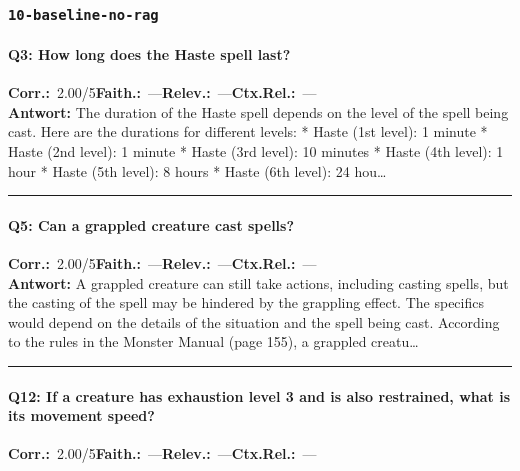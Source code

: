 \subsubsection*{\texttt{10-baseline-no-rag}}
\label{app:samples:10_baseline_no_rag}

\paragraph{Q3: How long does the Haste spell last?}
\noindent \textbf{Corr.:}~2.00/5\quad \textbf{Faith.:}~—\quad \textbf{Relev.:}~—\quad \textbf{Ctx.Rel.:}~—\\

\noindent\textbf{Antwort:} The duration of the Haste spell depends on the level of the spell being cast. Here are the durations for different levels:  * Haste (1st level): 1 minute * Haste (2nd level): 1 minute * Haste (3rd level): 10 minutes * Haste (4th level): 1 hour * Haste (5th level): 8 hours * Haste (6th level): 24 hou\ldots

\vspace{4pt}
\hrule
\vspace{6pt}

\paragraph{Q5: Can a grappled creature cast spells?}
\noindent \textbf{Corr.:}~2.00/5\quad \textbf{Faith.:}~—\quad \textbf{Relev.:}~—\quad \textbf{Ctx.Rel.:}~—\\

\noindent\textbf{Antwort:} A grappled creature can still take actions, including casting spells, but the casting of the spell may be hindered by the grappling effect. The specifics would depend on the details of the situation and the spell being cast.  According to the rules in the Monster Manual (page 155), a grappled creatu\ldots

\vspace{4pt}
\hrule
\vspace{6pt}

\paragraph{Q12: If a creature has exhaustion level 3 and is also restrained, what is its movement speed?}
\noindent \textbf{Corr.:}~2.00/5\quad \textbf{Faith.:}~—\quad \textbf{Relev.:}~—\quad \textbf{Ctx.Rel.:}~—\\

